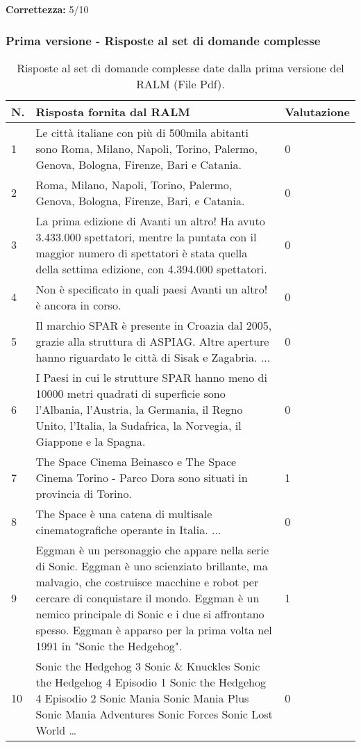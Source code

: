 \textbf{Correttezza:} 5/10

\subsubsection{Prima versione - Risposte al set di domande complesse}

\begin{table}[H]
    \centering
    \begin{tabular}{|p{0.5cm} |p{6cm} |p{2cm}|}
        \hline
        \textbf{N}. & \textbf{Risposta fornita dal RALM} & \textbf{Valutazione} \\
        \hline
        1 & Le città italiane con più di 500mila abitanti sono Roma, Milano, Napoli, Torino, Palermo, Genova, Bologna, Firenze, Bari e Catania. & 0 \\
        \hline
        2 & Roma, Milano, Napoli, Torino, Palermo, Genova, Bologna, Firenze, Bari, e Catania. & 0 \\
        \hline
        3 & La prima edizione di Avanti un altro! Ha avuto 3.433.000 spettatori, mentre la puntata con il maggior numero di spettatori è stata quella della settima edizione, con 4.394.000 spettatori. & 0 \\
        \hline
        4 & Non è specificato in quali paesi Avanti un altro! è ancora in corso. & 0 \\
        \hline
        5 & Il marchio SPAR è presente in Croazia dal 2005, grazie alla struttura di ASPIAG. Altre aperture hanno riguardato le città di Sisak e Zagabria. ... & 0 \\
        \hline
        6 & I Paesi in cui le strutture SPAR hanno meno di 10000 metri quadrati di superficie sono l'Albania, l'Austria, la Germania, il Regno Unito, l'Italia, la Sudafrica, la Norvegia, il Giappone e la Spagna. & 0 \\
        \hline
        7 & The Space Cinema Beinasco e The Space Cinema Torino - Parco Dora sono situati in provincia di Torino. & 1 \\
        \hline
        8 & The Space è una catena di multisale cinematografiche operante in Italia. ... & 0 \\
        \hline
        9 & Eggman è un personaggio che appare nella serie di Sonic. Eggman è uno scienziato brillante, ma malvagio, che costruisce macchine e robot per cercare di conquistare il mondo. Eggman è un nemico principale di Sonic e i due si affrontano spesso. Eggman è apparso per la prima volta nel 1991 in "Sonic the Hedgehog". & 1 \\
        \hline
        10 & Sonic the Hedgehog 3
        Sonic \& Knuckles
        Sonic the Hedgehog 4 Episodio 1
        Sonic the Hedgehog 4 Episodio 2
        Sonic Mania
        Sonic Mania Plus
        Sonic Mania Adventures
        Sonic Forces
        Sonic Lost World
        \dots & 0 \\
        \hline
    \end{tabular}
    \caption{Risposte al set di domande complesse date dalla prima versione del RALM (File Pdf).}
\end{table}

